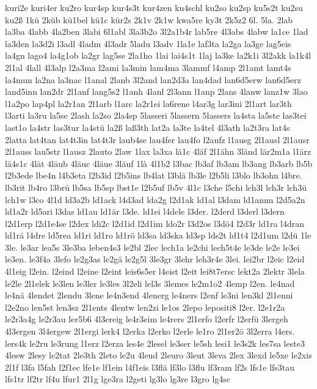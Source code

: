 {kuri2e
kuri4er
ku2ro
kur4sp
kur4s3t
kur4zen
ku4schl
ku2so
ku2sp
ku5s2t
ku2su
ku2ß
1kü
2küb
kü1bel
kü1c
kür2s
2k1v
2k1w
kwa5re
ky3t
2k5z2
6l.
5la.
2lab
la3ba
4labb
4la2ben
3labi
6l1abl
3la3b2o
3l2a1b4r
lab5re
4l3abs
4labw
la1ce
1lad
la3den
la3d2i
l3adl
4ladm
4l3adr
5ladu
l3adv
1la1e
laf3ta
la2ga
la3ge
lag5eis
la4gn
lago4
la4g1ob
la2gr
lag5se
2la1ho
1lai
lai4s1t
1laj
la3ke
la2k1i
3l2akk
la1k4l
2l1al
4lall
4l3alp
l2a3ma
l2ami
la3min
lam4ma
3lammf
l4amp
2l1amt
lamt4s
la4mun
la2na
la3nac
l1anal
2lanb
3l2and
lan2d3a
lan4dad
lan6d5erw
lan6d5erz
land5inn
lan2dr
2l1anf
lang5s2
l1anh
4lanl
2l3ann
l1anp
2lans
4lanw
lanz1w
3lao
l1a2po
lap4pl
la2r1an
2l1arb
l1arc
la2r1ei
la6rene
l4ar3g
lar3ini
2l1art
lar3th
l3arti
la3ru
la5se
2lash
la2so
2la4sp
5lasseri
5lassern
5lassers
la4sta
la5ste
las3tei
last1o
la4str
las3tur
la4stü
la2ß
laß3th
lat2a
la3te
la4tel
4l3ath
la2t3ra
lat4s
2latta
lat4tan
lat4t3in
lat4t3r
laub4se
lau4fer
lau4fo
l2aufz
l1ausg
2l1ausl
2l1ausr
2l1auss
lau5str
l1ausz
2lauto
2law
1lax
la3xa
lä1c
4läf
2l1ähn
3länd
lär2m1a
l1ärz
lä4s1c
4lät
4läub
4läuc
4läue
3läuf
1là
4l1b2
l3bac
lb3af
lb3am
lb3ang
lb3arb
lb5b
l2b3ede
lbe4n
l4b3eta
l2b3id
l2b5ins
lb4lat
l3blä
lb3le
l2b5li
l3blo
lb3ohn
l4bre.
lb3rit
lb4ro
l3brü
lb5sa
lb5sp
lbst1e
l2b5uf
lb5v
4l1c
l3che
l5chi
lch3l
lch3r
lch3ü
lch1w
l3co
4l1d
ld3a2b
ld1ack
l4d3ad
lda2g
l2d1ak
ld1al
l3dam
ld1amm
l2d5a2n
ld1a2r
ld5ari
l3das
ld1au
ld1är
l3de.
ld1ei
l4dele
l3der.
l2derd
l3derl
l3dern
l2d1erp
l2d1e4se
l2dex
ldi2c
l2d1id
l2d1im
ldo2r
l3d2os
l3dö4
l2d3r
ld1ra
l4dran
ld1rä
l4dre
ld5rea
ld1ri
ld1ro
ld1rö
ld3sa
ld3ska
ld3sp
lds2t
ld1t4
l2d1um
l2dü
1le
3le.
le3ar
lea5s
3le3ba
leben4s3
le2bl
2lec
lech1a
le2chi
lech5t4e
le3de
le2e
le3ei
le3en.
le3f4a
3lefo
le2g3as
le2gä
le2g5l
3le3gr
3lehr
leh3r4e
3lei.
lei2br
l2eic
l2eid
4l1eig
l2ein.
l2eind
l2eine
l2eint
leis6s5er
l4eist
l2eit
lei8t7ersc
lekt2a
2lektr
3lela
le2le
2l1elek
le3len
le3ler
le3les
3l2eli
lel3s
3lemes
le2m1o2
4lemp
l2en.
le4nad
le4nä
4lendet
2lendu
3lene
le4n3end
4lenerg
le4ners
l2enf
le3ni
len3kl
2l1enni
l2e2no
len5st
len3sz
2l1ents
4lentw
len2zi
le1os
2lepo
lepositi8
l2er.
l2e1r2a
le2r3a4g
le2r3au
ler5b6
4l3ereig
le4r3eim
le4rers
2l1erfo
l2erfr
l2erfü
3lergeh
4l3ergen
3l4ergew
2l1ergi
lerk4
l2erka
l2erko
l2erle
le1ro
2l1er2ö
3l2erra
l4ers.
lers4k
le2ru
le3rung
l1erz
l2erza
les4e
2lesel
le3ser
le5sh
lesi1
le3s2k
les7sa
leste3
4lesw
2lesy
le2tat
2le3th
2leto
le2u
4leud
2leuro
3leut
3leva
2lex
3lexd
le5xe
le2xis
2l1f
l3fa
l5fah
l2f1ec
lfe1e
lf1ein
l4f1eis
l3flä
lf3lo
l3flu
lf3ram
lf2s
lfs1e
lfs3tau
lfs1tr
lf2tr
lf4u
lfur1
2l1g
lge3ra
l2geti
lg3lo
lg3re
l3gro
lg4sc
}
